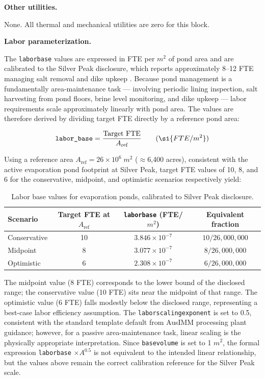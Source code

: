 \documentclass{article}
\renewcommand\_{\textunderscore\allowbreak}
\begin{document}
\medskip
\noindent\textbf{Other utilities.}\quad

None. All thermal and mechanical utilities are zero for this block.

\medskip
\noindent\textbf{Labor parameterization.}\quad

The \texttt{labor\_base} values are expressed in FTE per $\si{m^2}$ of pond area and are calibrated to the Silver Peak disclosure, which reports approximately 8--12 FTE managing salt removal and dike upkeep \cite{srkconsultingSECTechnicalReport2023a}. Because pond management is a fundamentally area-maintenance task --- involving periodic lining inspection, salt harvesting from pond floors, brine level monitoring, and dike upkeep --- labor requirements scale approximately linearly with pond area. The values are therefore derived by dividing target FTE directly by a reference pond area:
 
\[
  \texttt{labor\_base} = \frac{\text{Target FTE}}{A_\text{ref}} \qquad (\si{FTE/m^2})
\]
 
Using a reference area $A_\text{ref} = 26 \times 10^6\;\si{m^2}$ ($\approx$6,400 acres), consistent with the active evaporation pond footprint at Silver Peak, target FTE values of 10, 8, and 6 for the conservative, midpoint, and optimistic scenarios respectively yield:
 
\begin{table}[h!]
\caption{Labor base values for evaporation ponds, calibrated to Silver Peak disclosure.}
\label{tab:c-labor-base-ponds}
\centering
\begin{tabular}{lccc}
\toprule
\textbf{Scenario} & \textbf{Target FTE at $A_\text{ref}$} & \textbf{\texttt{labor\_base} (FTE/$\si{m^2}$)} & \textbf{Equivalent fraction} \\
\midrule
Conservative & 10 & $3.846 \times 10^{-7}$ & $10 / 26,000,000$ \\
Midpoint     &  8 & $3.077 \times 10^{-7}$ & $8 / 26,000,000$  \\
Optimistic   &  6 & $2.308 \times 10^{-7}$ & $6 / 26,000,000$  \\
\bottomrule
\end{tabular}
\end{table}
 
\noindent The midpoint value (8 FTE) corresponds to the lower bound of the disclosed range; the conservative value (10 FTE) sits near the midpoint of that range. The optimistic value (6 FTE) falls modestly below the disclosed range, representing a best-case labor efficiency assumption. The \texttt{labor\_scaling\_exponent} is set to 0.5, consistent with the standard template default from AusIMM processing plant guidance; however, for a passive area-maintenance task, linear scaling is the physically appropriate interpretation. Since \texttt{base\_volume} is set to 1 $\si{m^2}$, the formal expression \texttt{labor\_base} $\times A^{0.5}$ is not equivalent to the intended linear relationship, but the values above remain the correct calibration reference for the Silver Peak scale.
\end{document}
